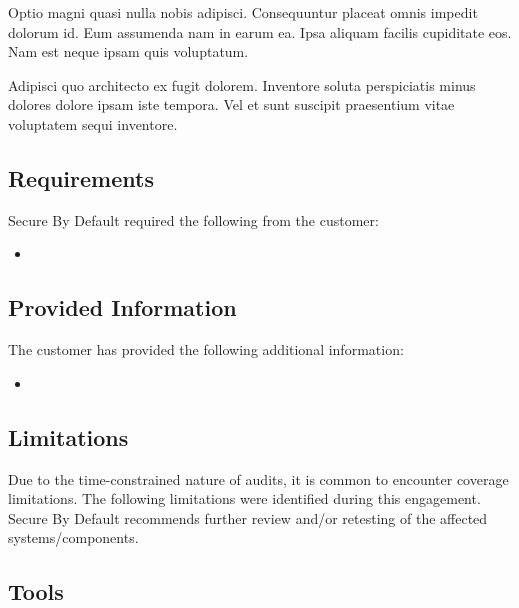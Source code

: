 Optio magni quasi nulla nobis adipisci.
Consequuntur placeat omnis impedit dolorum id.
Eum assumenda nam in earum ea.
Ipsa aliquam facilis cupiditate eos.
Nam est neque ipsam quis voluptatum.

Adipisci quo architecto ex fugit dolorem.
Inventore soluta perspiciatis minus dolores dolore ipsam iste tempora.
Vel et sunt suscipit praesentium vitae voluptatem sequi inventore.

  \subsection{Requirements}

  Secure By Default required the following from the customer:

  \begin{itemize}
      \item {}
  \end{itemize}

  \subsection{Provided Information}

  The customer has provided the following additional information:

  \begin{itemize}
      \item {}
  \end{itemize}

  \subsection{Limitations}

  Due to the time-constrained nature of audits, it is common to encounter coverage limitations.
  The following limitations were identified during this engagement.
  Secure By Default recommends further review and/or retesting of the affected systems/components.


\subsection{Tools}


